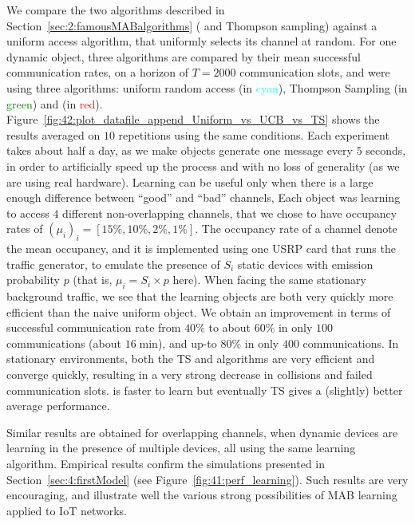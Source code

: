 We compare the two algorithms described in Section~\ref{sec:2:famousMABalgorithms} (\UCB{} and Thompson sampling) against a uniform access algorithm, that uniformly selects its channel at random.
For one dynamic object, three algorithms are compared by their mean successful communication rates, on a horizon of $T=2000$ communication slots, and were using three algorithms: uniform random access (in \textcolor{cyan}{cyan}), Thompson Sampling (in \textcolor{green}{green}) and \UCB{} (in \textcolor{red}{red}).
Figure~\ref{fig:42:plot_datafile_append_Uniform_vs_UCB_vs_TS} shows the results averaged on $10$ repetitions using the same conditions.
%
Each experiment takes about half a day,
as we make objects generate one message every $5$ seconds, in order to artificially speed up the process and with no loss of generality (as we are using real hardware).
Learning can be useful only when there is a large enough difference between ``good'' and ``bad'' channels,
Each object was learning to access $4$ different non-overlapping channels, that we chose to have occupancy rates of $(\mu_i)_i = [15\%, 10\%, 2\%, 1\%]$.
The occupancy rate of a channel denote the mean occupancy, and it is implemented using one USRP card that runs the traffic generator, to emulate the presence of $S_i$ static devices with emission probability $p$ (that is, $\mu_i = S_i \times p$ here).
When facing the same stationary background traffic, we see that the learning objects are both very quickly more efficient than the naive uniform object.
We obtain an improvement in terms of successful communication rate from $40\%$ to about $60\%$ in only $100$ communications (about $16\;\mathrm{min}$), and up-to $80\%$ in only $400$ communications.
%
In stationary environments, both the TS and \UCB{} algorithms are very efficient and converge quickly, resulting in a very strong decrease in collisions and failed communication slots. \UCB{} is faster to learn but eventually TS gives a (slightly) better average performance.

Similar results are obtained for overlapping channels, when dynamic devices are learning in the presence of multiple devices, all using the same learning algorithm.
Empirical results confirm the simulations presented in Section~\ref{sec:4:firstModel} (see Figure~\ref{fig:41:perf_learning}).
Such results are very encouraging, and illustrate well the various strong possibilities of MAB learning applied to IoT networks.


